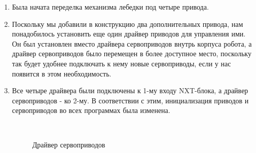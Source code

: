 \begin{enumerate}
\begin{enumerate}
		\item Была начата переделка механизма лебедки под четыре привода.
		
		\item Поскольку мы добавили в конструкцию два дополнительных привода, нам понадобилось установить еще один драйвер приводов для управления ими. Он был установлен вместо драйвера сервоприводов внутрь корпуса робота, а драйвер сервоприводов было перемещен в более доступное место, поскольку так будет удобнее подключать к нему новые сервоприводы, если у нас появится в этом необходимость.
		
		\item Все четыре драйвера были подключены к 1-му входу NXT-блока, а драйвер сервоприводов - ко 2-му. В соответствии с этим, инициализация приводов и сервоприводов во всех программах была изменена.
		
		\begin{figure}[H]
			\begin{minipage}[h]{0.2\linewidth}
				\center  
			\end{minipage}
			\begin{minipage}[h]{0.6\linewidth}
				\caption{Драйвер сервоприводов}
			\end{minipage}
		\end{figure}
		

\end{enumerate}
\end{enumerate}
